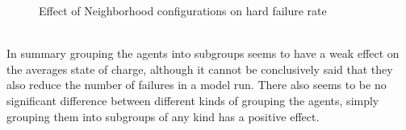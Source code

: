 \documentclass[a4paper]{article}
\begin{document}
\begin{figure}[!ht]
\caption{Effect of Neighborhood configurations on hard failure rate}
\label{group_hard_failures}
\end{figure}
\\
In summary grouping the agents into subgroups seems to have a weak effect on the averages state of charge, although it cannot be
conclusively said that they also reduce the number of failures in a  model run. There also seems to be no significant difference 
between different kinds of grouping the agents, simply grouping them into subgroups of any kind has a positive effect. 
\end{document}
